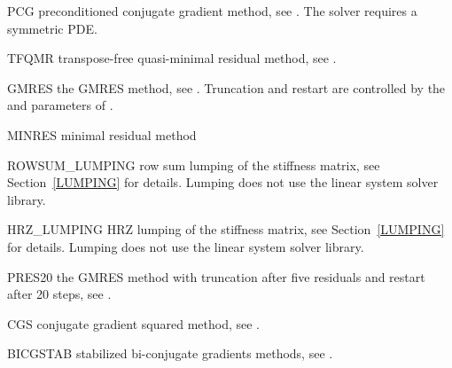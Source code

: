 \begin{memberdesc}[SolverOptions]{PCG}
preconditioned conjugate gradient method, see .
The solver requires a symmetric PDE.
\end{memberdesc}

\begin{memberdesc}[SolverOptions]{TFQMR}
transpose-free quasi-minimal residual method, see .
\end{memberdesc}

\begin{memberdesc}[SolverOptions]{GMRES}
the GMRES method, see .
Truncation and restart are controlled by the  and 
parameters of .
\end{memberdesc}

\begin{memberdesc}[SolverOptions]{MINRES}
minimal residual method
\end{memberdesc}

\begin{memberdesc}[SolverOptions]{ROWSUM_LUMPING}
row sum lumping of the stiffness matrix, see Section~\ref{LUMPING} for details.
Lumping does not use the linear system solver library.
\end{memberdesc}

\begin{memberdesc}[SolverOptions]{HRZ_LUMPING}
HRZ lumping of the stiffness matrix, see Section~\ref{LUMPING} for details.
Lumping does not use the linear system solver library.
\end{memberdesc}

\begin{memberdesc}[SolverOptions]{PRES20}
the GMRES method with truncation after five residuals and restart after
20 steps, see .
\end{memberdesc}

\begin{memberdesc}[SolverOptions]{CGS}
conjugate gradient squared method, see .
\end{memberdesc}

\begin{memberdesc}[SolverOptions]{BICGSTAB}
stabilized bi-conjugate gradients methods, see .
\end{memberdesc}

